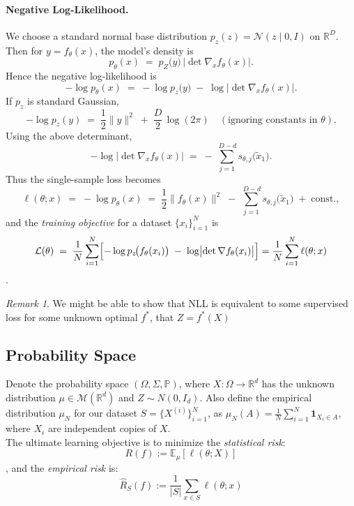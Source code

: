 \documentclass[11pt, a4paper]{article}
\theoremstyle{definition}
\theoremstyle{remark}
\newtheorem{remark}[theorem]{Remark}
\newcommand{\R}{\mathbb{R}}
\newcommand{\E}{\mathbb{E}}
\newcommand{\Prob}{\mathbb{P}}
\begin{document}
	\paragraph{Negative Log-Likelihood.}
	We choose a standard normal base distribution $p_z(z) = \mathcal{N}(z \mid 0, I)$ on $\mathbb{R}^D$. 
	Then for $y = f_\theta(x)$, 
	the model's density is 
	\[
	p_\theta(x)
	\;=\;
	p_Z\bigl(y\bigr)
	\,\bigl|\det \nabla_x f_\theta(x)\bigr|.
	\]
	Hence the negative log-likelihood is
	\[
	-\log p_\theta(x)
	\;=\;
	-\log p_z\!\bigl(y\bigr)
	\;-\; 
	\log \bigl|\det \nabla_x f_\theta(x)\bigr|.
	\]
	If $p_z$ is standard Gaussian, 
	\[
	-\log p_z(y)
	\;=\;
	\frac12 \|y\|^2 \;+\; \frac{D}{2}\,\log (2\pi)
	\quad (\text{ignoring constants in } \theta).
	\]
	Using the above determinant,
	\[
	-\log \bigl|\det \nabla_x f_\theta(x)\bigr|
	\;=\;
	-\,\sum_{j=1}^{\,D-d} s_{\theta,j}\!\bigl(\tilde{x}_1\bigr).
	\]
	Thus the single-sample loss becomes
	\[
	\ell(\theta; x)
	\;=\;
	-\log p_\theta(x)
	\;=\;
	\frac12 \|f_\theta(x)\|^2 
	\;-\;
	\sum_{j=1}^{\,D-d} s_{\theta,j}\!\bigl(\tilde{x}_1\bigr)
	\;+\;
	\text{const.},
	\]
	and the \emph{training objective} for a dataset $\{x_i\}_{i=1}^N$ is 
	\[
	\mathcal{L}(\theta)
	\;=\;
	\frac{1}{N} \sum_{i=1}^N
	\Bigl[
	- \log p_z\!\bigl(f_\theta(x_i)\bigr)
	\;-\;
	\log \bigl|\det \nabla f_\theta(x_i)\bigr|
	\Bigr] 	= \frac1N \sum_{i=1}^{N} \ell(\theta;x)
	\].

	\begin{remark}
		We might be able to show that NLL is equivalent to some supervised loss for some unknown optimal \(f^*\), that \(Z = f^*(X)\)
	\end{remark}

	\subsection{Probability Space}
	
	Denote the probability space \((\Omega,\Sigma,\Prob)\), where \(X: \Omega \to \R^d\) has the unknown distribution \(\mu \in \mathcal{M}(\R^d)\) and \(Z \sim N(0,I_d)\). Also define the empirical distribution \(\mu_N\) for our dataset \(S=\{X^{(i)}\}_{i=1}^N\), as \(\mu_N(A) = \frac{1}{N}\sum_{i=1}^{N} \mathbf{1}_{X_i \in A}\), where \(X_i\) are independent copies of \(X\).\\
	
	The ultimate learning objective is to minimize the \textit{statistical risk}:
	\[
	R(f):=\E_\mu[\ell(\theta;X)]
	\]
	, and the \textit{empirical risk} is: 
	\[
	\hat{R}_S(f):=\frac{1}{|S|}\sum_{x\in S} \ell(\theta;x)
	\]
	
\end{document}
